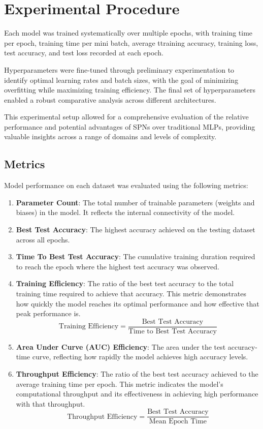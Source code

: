 
\section{Experimental Procedure}

Each model was trained systematically over multiple epochs, with training time per epoch, training time per mini batch, average ttraining accuracy, training loss, test accuracy, and test loss recorded at each epoch.

Hyperparameters were fine-tuned through preliminary experimentation to identify optimal learning rates and batch sizes, with the goal of minimizing overfitting while maximizing training efficiency. The final set of hyperparameters enabled a robust comparative analysis across different architectures.

This experimental setup allowed for a comprehensive evaluation of the relative performance and potential advantages of SPNs over traditional MLPs, providing valuable insights across a range of domains and levels of complexity.

\subsection{Metrics}
Model performance on each dataset was evaluated using the following metrics:
\begin{enumerate}
\item \textbf{Parameter Count}: The total number of trainable parameters (weights and biases) in the model. It reflects the internal connectivity of the model.
\item \textbf{Best Test Accuracy}: The highest accuracy achieved on the testing dataset across all epochs.
\item \textbf{Time To Best Test Accuracy}: The cumulative training duration required to reach the epoch where the highest test accuracy was observed.
\item \textbf{Training Efficiency}: The ratio of the best test accuracy to the total training time required to achieve that accuracy. This metric demonstrates how quickly the model reaches its optimal performance and how effective that peak performance is.
    \[
    \text{Training Efficiency} = \frac{\text{Best Test Accuracy}}{\text{Time to Best Test Accuracy}}
    \]
\item \textbf{Area Under Curve (AUC) Efficiency}: The area under the test accuracy-time curve, reflecting how rapidly the model achieves high accuracy levels.
\item \textbf{Throughput Efficiency}: The ratio of the best test accuracy achieved to the average training time per epoch. This metric indicates the model's computational throughput and its effectiveness in achieving high performance with that throughput.
    \[
    \text{Throughput Efficiency} = \frac{\text{Best Test Accuracy}}{\text{Mean Epoch Time}}
    \]
\end{enumerate}

